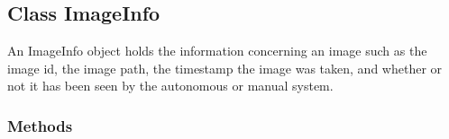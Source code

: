 \subsection{Class ImageInfo}

    \label{client_rest:ImageInfo}
An ImageInfo object holds the information concerning an image such as the 
image id, the image path, the timestamp the image was taken, and whether or
not it has been seen by the autonomous or manual system.



  \subsubsection{Methods}

    \label{client_rest:ImageInfo:__init__}

    \vspace{0.5ex}

